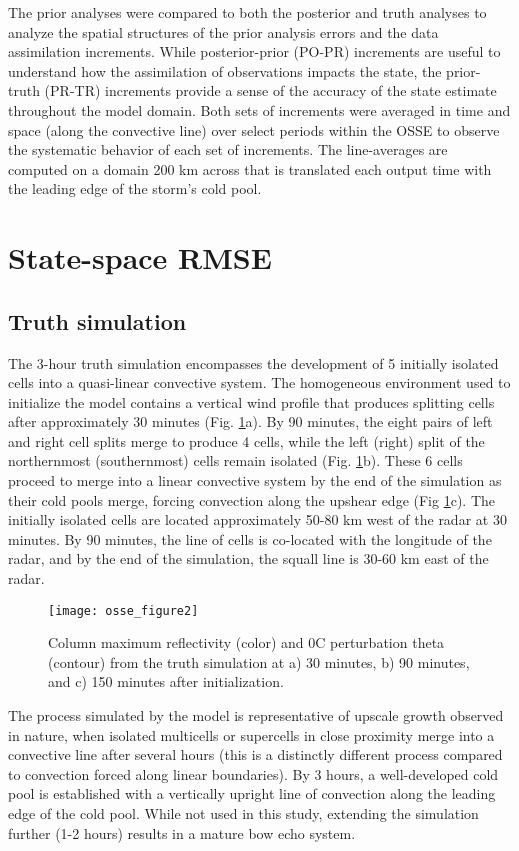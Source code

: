The prior analyses were compared to both the posterior and truth analyses to analyze the spatial structures of the prior analysis errors and the data assimilation increments. While posterior-prior (PO-PR) increments are useful to understand how the assimilation of observations impacts the state, the prior-truth (PR-TR) increments provide a sense of the accuracy of the state estimate throughout the model domain. Both sets of increments were averaged in time and space (along the convective line) over select periods within the OSSE to observe the systematic behavior of each set of increments. The line-averages are computed on a domain 200 km across that is translated each output time with the leading edge of the storm’s cold pool.

\section{State-space RMSE}
\subsection{Truth simulation}
The 3-hour truth simulation encompasses the development of 5 initially isolated cells into a quasi-linear convective system. The homogeneous environment used to initialize the model contains a vertical wind profile that produces splitting cells after approximately 30 minutes (Fig. \ref{osse_fig2}a). By 90 minutes, the eight pairs of left and right cell splits merge to produce 4 cells, while the left (right) split of the northernmost (southernmost) cells remain isolated (Fig. \ref{osse_fig2}b). These 6 cells proceed to merge into a linear convective system by the end of the simulation as their cold pools merge, forcing convection along the upshear edge (Fig \ref{osse_fig2}c). The initially isolated cells are located approximately 50-80 km west of the radar at 30 minutes. By 90 minutes, the line of cells is co-located with the longitude of the radar, and by the end of the simulation, the squall line is 30-60 km east of the radar.

\begin{figure}
\centering
\texttt{[image: osse\_figure2]}
\caption{Column maximum reflectivity (color) and 0C perturbation theta (contour) from the truth simulation at a) 30 minutes, b) 90 minutes, and c) 150 minutes after initialization.}
\label{osse_fig2}
\end{figure}

The process simulated by the model is representative of upscale growth observed in nature, when isolated multicells or supercells in close proximity merge into a convective line after several hours (this is a distinctly different process compared to convection forced along linear boundaries). By 3 hours, a well-developed cold pool is established with a vertically upright line of convection along the leading edge of the cold pool. While not used in this study, extending the simulation further (1-2 hours) results in a mature bow echo system.

